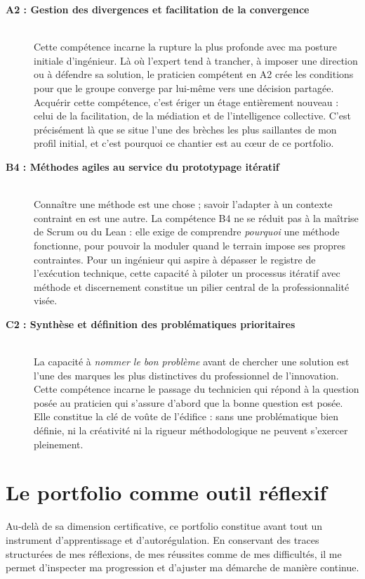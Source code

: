 \begin{description}
    \item[\textbf{A2 : Gestion des divergences et facilitation de la convergence}] \hfill \\
    Cette compétence incarne la rupture la plus profonde avec ma posture initiale d'ingénieur. Là où l'expert tend à trancher, à imposer une direction ou à défendre sa solution, le praticien compétent en A2 crée les conditions pour que le groupe converge par lui-même vers une décision partagée. Acquérir cette compétence, c'est ériger un étage entièrement nouveau : celui de la facilitation, de la médiation et de l'intelligence collective. C'est précisément là que se situe l'une des brèches les plus saillantes de mon profil initial, et c'est pourquoi ce chantier est au cœur de ce portfolio.

    \item[\textbf{B4 : Méthodes agiles au service du prototypage itératif}] \hfill \\
    Connaître une méthode est une chose ; savoir l'adapter à un contexte contraint en est une autre. La compétence B4 ne se réduit pas à la maîtrise de Scrum ou du Lean : elle exige de comprendre \emph{pourquoi} une méthode fonctionne, pour pouvoir la moduler quand le terrain impose ses propres contraintes. Pour un ingénieur qui aspire à dépasser le registre de l'exécution technique, cette capacité à piloter un processus itératif avec méthode et discernement constitue un pilier central de la professionnalité visée.

    \item[\textbf{C2 : Synthèse et définition des problématiques prioritaires}] \hfill \\
    La capacité à \emph{nommer le bon problème} avant de chercher une solution est l'une des marques les plus distinctives du professionnel de l'innovation. Cette compétence incarne le passage du technicien qui répond à la question posée au praticien qui s'assure d'abord que la bonne question est posée. Elle constitue la clé de voûte de l'édifice : sans une problématique bien définie, ni la créativité ni la rigueur méthodologique ne peuvent s'exercer pleinement.
\end{description}

\section{Le portfolio comme outil réflexif}

Au-delà de sa dimension certificative, ce portfolio constitue avant tout un instrument d'apprentissage et d'autorégulation. En conservant des traces structurées de mes réflexions, de mes réussites comme de mes difficultés, il me permet d'inspecter ma progression et d'ajuster ma démarche de manière continue.

